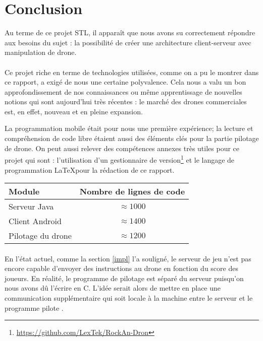 \newpage
\section{Conclusion}

Au terme de ce projet STL, il apparaît que nous avons su correctement répondre aux besoins du sujet : la possibilité de créer une architecture client-serveur avec manipulation de drone.

\paragraph{}
Ce projet riche en terme de technologies utilisées, comme on a pu le montrer dans ce rapport, a exigé de nous une certaine polyvalence. Cela nous a valu un bon approfondissement de nos connaissances ou même apprentissage de nouvelles notions qui sont aujourd'hui très récentes : le marché des drones commerciales est, en effet, nouveau et en pleine expansion. 

La programmation mobile \android{} était pour nous une première expérience; la lecture et compréhension de code libre étaient aussi des éléments clés pour la partie pilotage de drone. On peut aussi relever des compétences annexes très utiles pour ce projet qui sont : l'utilisation d'un gestionnaire de version\footnote{\url{https://github.com/LexTek/RockAn-Dron}} et le langage de programmation \LaTeX pour la rédaction de ce rapport.

\begin{center}
\begin{tabular}{|l|c|}
\hline
\textbf{Module} & \textbf{Nombre de lignes de code} \\
\hline
Serveur Java & $\approx 1000$ \\
\hline
Client Android & $\approx 1400$ \\
\hline
Pilotage du drone & $\approx 1200$ \\
\hline
\end{tabular}
\end{center}

\paragraph{}
En l'état actuel, comme la section \ref{impl} l'a souligné, le serveur de jeu n'est pas encore capable d'envoyer des instructions au drone en fonction du score des joueurs. En réalité, le programme de pilotage est séparé du serveur puisqu'on nous avons dû l'écrire en C. L'idée serait alors de mettre en place une communication supplémentaire qui soit locale à la machine entre le serveur et le \og programme pilote \fg{}.

